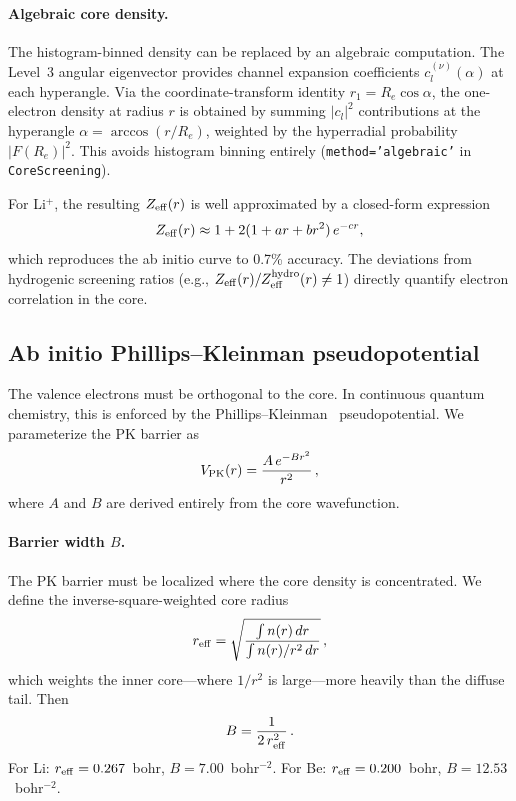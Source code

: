 \documentclass[aps,pra,twocolumn,superscriptaddress,longbibliography,floatfix]{revtex4-2}
\begin{document}
\paragraph{Algebraic core density.}
The histogram-binned density can be replaced by an algebraic
computation.  The Level~3 angular eigenvector provides channel
expansion coefficients $c_{l}^{(\nu)}(\alpha)$ at each hyperangle.
Via the coordinate-transform identity
$r_1 = R_e \cos\alpha$, the one-electron density at radius $r$
is obtained by summing $|c_l|^2$ contributions at the hyperangle
$\alpha = \arccos(r/R_e)$, weighted by the hyperradial probability
$|F(R_e)|^2$.  This avoids histogram binning entirely
(\texttt{method='algebraic'} in \texttt{CoreScreening}).

For Li$^+$, the resulting $Z_{\rm eff}(r)$ is well approximated
by a closed-form expression
\begin{equation}
  Z_{\rm eff}(r) \approx 1 + 2(1 + ar + br^2)\,e^{-cr},
  \label{eq:zeff_fit}
\end{equation}
which reproduces the ab initio curve to 0.7\% accuracy.
The deviations from hydrogenic screening ratios
(e.g., $Z_{\rm eff}(r)/Z_{\rm eff}^{\rm hydro}(r) \ne 1$)
directly quantify electron correlation in the core.


\subsection{Ab initio Phillips--Kleinman pseudopotential}
\label{sec:pk}

The valence electrons must be orthogonal to the core.  In continuous
quantum chemistry, this is enforced by the
Phillips--Kleinman~\cite{pk1959} pseudopotential.
We parameterize the PK barrier as
\begin{equation}
  V_{\rm PK}(r) = \frac{A\,e^{-Br^2}}{r^2}\,,
  \label{eq:Vpk}
\end{equation}
where $A$ and $B$ are derived entirely from the core wavefunction.

\paragraph{Barrier width $B$.}
The PK barrier must be localized where the core density is concentrated.
We define the inverse-square-weighted core radius
\begin{equation}
  r_{\rm eff} = \sqrt{\frac{\int n(r)\,dr}
    {\int n(r)/r^2\,dr}}\,,
  \label{eq:reff}
\end{equation}
which weights the inner core---where $1/r^2$ is large---more heavily
than the diffuse tail.  Then
\begin{equation}
  B = \frac{1}{2\,r_{\rm eff}^2}\,.
  \label{eq:B}
\end{equation}
For Li: $r_{\rm eff} = 0.267$~bohr, $B = 7.00$~bohr$^{-2}$.
For Be: $r_{\rm eff} = 0.200$~bohr, $B = 12.53$~bohr$^{-2}$.
\end{document}
